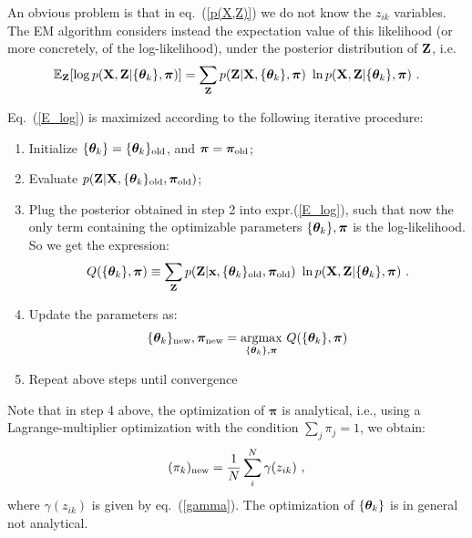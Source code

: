 An obvious problem is that in eq.~(\ref{p(X,Z)}) we do not know the $z_{ik}$ variables. The EM algorithm considers instead the expectation value of this likelihood (or more concretely, of the log-likelihood), under the posterior distribution of ${\bf Z}$, i.e.
\begin{equation}
\label{E_log}
\mathbb{E}_{\bf Z} 
[\log p({\bf X,Z}|\{\boldsymbol{\theta}_k\},\boldsymbol{\pi}) ] =
\sum_{\bf Z} 
p({\bf Z}|{\bf X},\{\boldsymbol{\theta}_k\},\boldsymbol{\pi})~
\ln p({\bf X,Z}|\{\boldsymbol{\theta}_k\},\boldsymbol{\pi})~.
\end{equation}

Eq.~(\ref{E_log}) is maximized according to the following iterative procedure:
\begin{enumerate}
    \item Initialize $\{\boldsymbol{\theta}_k\}=\{\boldsymbol{\theta}_k\}_{\rm old}$, and $\boldsymbol{\pi} = \boldsymbol{\pi}_{\rm old}$;
    \item Evaluate $p({\bf Z}|{\bf X},\{\boldsymbol{\theta}_k\}_{\rm old},\boldsymbol{\pi}_{\rm old})$;
    \item Plug the posterior obtained in step 2 into expr.(\ref{E_log}), such that now the only term containing the optimizable parameters $\{\boldsymbol{\theta}_k\},\boldsymbol{\pi}$ is the log-likelihood. So we get the expression:
    \begin{equation}
      Q(\{\boldsymbol{\theta}_k\},\boldsymbol{\pi}) \equiv
     \sum_{\bf Z} 
    p({\bf Z}|\textbf{x},\{\boldsymbol{\theta}_k\}_{\rm old},\boldsymbol{\pi}_{\rm old})~
\ln p({\bf X,Z}|\{\boldsymbol{\theta}_k\},\boldsymbol{\pi})~.  
    \end{equation}
    \item Update the parameters as:
    \begin{equation}
      \{\boldsymbol{\theta}_k\}_{\rm new},\boldsymbol{\pi}_{\rm new} =
      \underset{\{\boldsymbol{\theta}_k\},\boldsymbol{\pi}}
      {\rm argmax}~Q(\{\boldsymbol{\theta}_k\},\boldsymbol{\pi})
    \end{equation}
    \item Repeat above steps until convergence
\end{enumerate}
Note that in step 4 above, the optimization of $\boldsymbol{\pi}$ is analytical, i.e., using a Lagrange-multiplier optimization with the condition $\sum_j \pi_j = 1$, we obtain:
\begin{equation}
    (\pi_k)_{\rm new} = \frac{1}{N}\sum_i^N \gamma(z_{ik})~,
\end{equation}
where $\gamma(z_{ik})$ is given by eq.~(\ref{gamma}). The optimization of $\{\boldsymbol{\theta}_k\}$ is in general not analytical.

